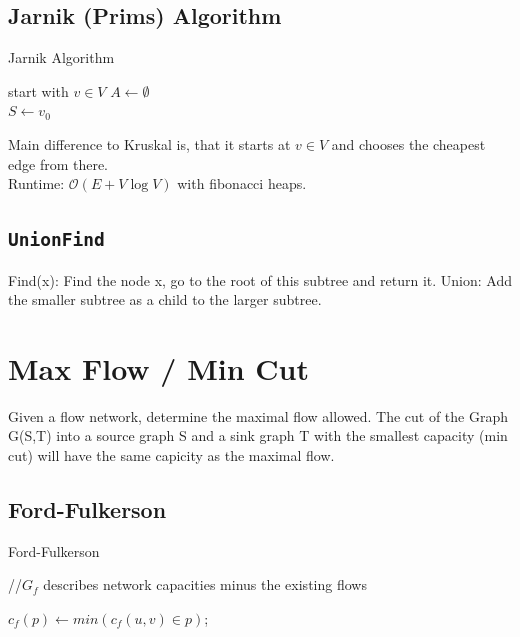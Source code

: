 \documentclass[10pt,landscape,a4paper, table]{extarticle}
\begin{document}
\begin{multicols*}{3}
\subsection{Jarnik (Prims) Algorithm}
{\scriptsize
\begin{algorithm}[H]
    \caption{Jarnik Algorithm}
    \label{FWAlgorithm}
    \SetAlgoLined
    start with $v \in V$
    $A \leftarrow \emptyset$\\
    $S \leftarrow {v_0}$
\end{algorithm}}
Main difference to Kruskal is, that it starts at $v \in V$ and chooses the cheapest edge from there.\\
Runtime: $\mathcal{O}(E + V \log V)$ with fibonacci heaps.
\subsection{\texttt{UnionFind}}
Find(x): Find the node x, go to the root of this subtree and return it.
Union: Add the smaller subtree as a child to the larger subtree.

\section{Max Flow / Min Cut}
Given a flow network, determine the maximal flow allowed.
The cut of the Graph G(S,T) into a source graph S and a sink graph T with the smallest capacity (min cut) will have the same capicity as the maximal flow.

\subsection{Ford-Fulkerson}

{\scriptsize
\begin{algorithm}[H]
    \caption{Ford-Fulkerson}
    \label{FWAlgorithm}
    \SetAlgoLined
    
    //$G_f$ describes network capacities minus the existing flows
    
    {
        $c_f(p) \leftarrow min( c_f(u,v)  \in p )$;
        
}
\end{algorithm}}
\end{multicols*}
\end{document}
